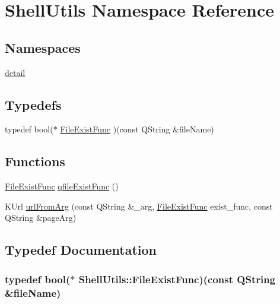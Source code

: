 \hypertarget{namespaceShellUtils}{\section{Shell\+Utils Namespace Reference}
\label{namespaceShellUtils}
}
\subsection*{Namespaces}
\begin{DoxyCompactItemize}
\item 
 \hyperlink{namespaceShellUtils_1_1detail}{detail}
\end{DoxyCompactItemize}
\subsection*{Typedefs}
\begin{DoxyCompactItemize}
\item 
typedef bool($\ast$ \hyperlink{namespaceShellUtils_ae6534a80c9166faa9586519f959eaa9f}{File\+Exist\+Func} )(const Q\+String \&file\+Name)
\end{DoxyCompactItemize}
\subsection*{Functions}
\begin{DoxyCompactItemize}
\item 
\hyperlink{namespaceShellUtils_ae6534a80c9166faa9586519f959eaa9f}{File\+Exist\+Func} \hyperlink{namespaceShellUtils_ab05242bcac02b689462792c2a31e74e5}{qfile\+Exist\+Func} ()
\item 
K\+Url \hyperlink{namespaceShellUtils_a6ef2e7befd7842610901b2b31e8ecb70}{url\+From\+Arg} (const Q\+String \&\+\_\+arg, \hyperlink{namespaceShellUtils_ae6534a80c9166faa9586519f959eaa9f}{File\+Exist\+Func} exist\+\_\+func, const Q\+String \&page\+Arg)
\end{DoxyCompactItemize}


\subsection{Typedef Documentation}
\hypertarget{namespaceShellUtils_ae6534a80c9166faa9586519f959eaa9f}{
\subsubsection[{File\+Exist\+Func}]{\setlength{\rightskip}{0pt plus 5cm}typedef bool($\ast$ Shell\+Utils\+::\+File\+Exist\+Func)(const Q\+String \&file\+Name)}}\label{namespaceShellUtils_ae6534a80c9166faa9586519f959eaa9f}


